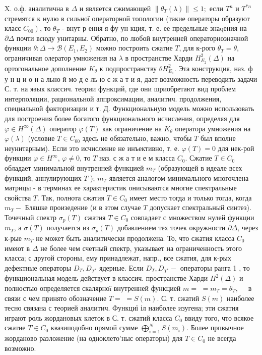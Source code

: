 \documentclass[10pt]{article}
\begin{document}
X. о.ф. аналитична в $\Delta$ и является сжимающей $\left\|\theta_{T}(\lambda)\right\| \leqslant 1 ;$ если $T^{n}$ и $T^{* n}$ стремятся к нулю в сильної операторной топологии (такие операторы образуют класс $\left.C_{00}\right)$, то $\theta_{T}$ - внут р ення я фу ун кция, т. е. ее предельные знаqения на $\partial \Delta$ почти всюду унитарны. Обратно, по любой внутренней операторнозначной функции $\theta: \Delta \rightarrow \mathscr{B}\left(E_{1}, E_{2}\right)$ можно построить сжатие $T$, для к-рого $\theta_{T}=\theta$, ограничивая олератор умножения на $\lambda$ в пространстве Харди $H_{E_{2}}^{2}(\Delta)$ на ортогональное дополнение $K_{\theta}$ к подпространству $\theta H_{E_{1}}^{2}$. Эта конструкция, наз. ф у н ц и о н а льно й мо д $е$ ль ю с ж а т и я, дает возможность переводить задачи С. т. на яәык классич. теории функций, где они шриобретают вид проблем интерполяции, рациональной аппроксимации, аналитич. продолжения, специальноӥ факторизации и т. Д. Функциональную модель можно использовать для построения более богатого функционального исчисления, определяя для $\varphi \in H^{\infty}(\Delta)$ оператор $\varphi(T)$ как ограничение на $K_{\theta}$ оператора умножения на $\varphi(\lambda)$ (условие $T \in C_{00}$ здесь не обязательно, важно, чтобы $T$ был вполне неунитарным). Если это исчисление не инъективно, т. е. $\varphi(T)=0$ для нек-рой функции $\varphi \in H^{\infty}$, $\varphi \neq 0$, то $T$ наз. с ж а т и е м класса $C_{0}$. Сжатие $T \in C_{0}$ обладает минимальной внутренней функцией $m_{T}$ (образующей в идеале всех функций, аннулирующих $T$ ); $m_{T}$ является аналогом минимального многочлена матрицы - в терминах ее характеристик онисываются многие спектральные свойства $T$. Так, полнота сжатия $T \in C_{0}$ имеет место тогда и только тогда, когда $m_{T}-$ Бляшке произедение (и в этом случае $T$ допускает спектральный синтез). Точечный спектр $\sigma_{p}(T)$ сжатия $T \in C_{0}$ совпадает с множеством нулей функции $m_{T}$, а $\sigma(T)$ получается из $\sigma_{p}(T)$ добавлением тех точек окружности $\partial \Delta$, через к-рые $m_{T}$ не может быть аналитически продолжена. То, что сжатия класса $C_{0}$ имеют в $\Delta$ не более чем счетный спектр, указывает на ограниченность этого класса; с другой стороны, ему принадлежат, напр., все сжатия, для к-рых дефектные операторы $D_{T}, D_{T^{*}}$ ядерные. Если $D_{T}, D_{T^{*}}-$ операторы ранга 1 , то функциональная модель действует в классич. пространстве Харди $H^{2}(\Delta)$ и полностью определяется скалярноï внутренней функцией $m=$ $=m_{T}=\theta_{T}, \quad$ в связи с чем принято обозначение $T=$ $=S(m)$. С. т. сжатий $S(m)$ наиболее тесно связана с теорией аналитич. Функциї іл наиболее изугена; эти сжатия играют роль жордановых клеток в С. т. сжатий класса $C_{0}$ ввиду того, что всякое сжатие $T \in C_{0}$ квазиподобно прямой сумме $\bigoplus_{i=1}^{N} S\left(m_{i}\right)$. Более прпвычное жорданово разложение (на одноклето'ныс операторы) для $T \in C_{0}$ не всегда возможно.
\end{document}
